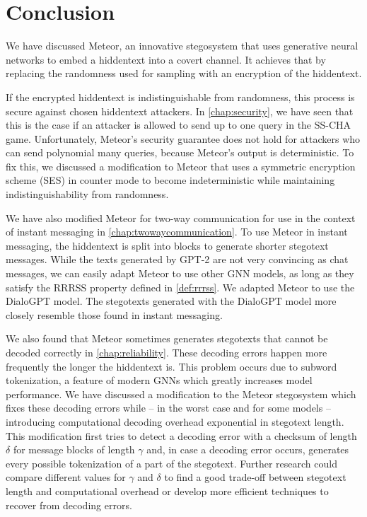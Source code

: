 \chapter{Conclusion}
\label{chap:conclusion}

We have discussed Meteor, an innovative stegosystem that uses generative neural networks to embed a hiddentext into a covert channel.
It achieves that by replacing the randomness used for sampling with an encryption of the hiddentext.

If the encrypted hiddentext is indistinguishable from randomness, this process is secure against chosen hiddentext attackers.
In \autoref{chap:security}, we have seen that this is the case if an attacker is allowed to send up to one query in the SS-CHA game.
Unfortunately, Meteor's security guarantee does not hold for attackers who can send polynomial many queries, because Meteor's output is deterministic.
To fix this, we discussed a modification to Meteor that uses a symmetric encryption scheme (SES) in counter mode to become indeterministic while maintaining indistinguishability from randomness.

We have also modified Meteor for two-way communication for use in the context of instant messaging in \autoref{chap:twowaycommunication}.
To use Meteor in instant messaging, the hiddentext is split into blocks to generate shorter stegotext messages.
While the texts generated by GPT-2 are not very convincing as chat messages, we can easily adapt Meteor to use other GNN models, as long as they satisfy the RRRSS property defined in \autoref{def:rrrss}.
We adapted Meteor to use the DialoGPT model.
The stegotexts generated with the DialoGPT model more closely resemble those found in instant messaging.

We also found that Meteor sometimes generates stegotexts that cannot be decoded correctly in \autoref{chap:reliability}.
These decoding errors happen more frequently the longer the hiddentext is.
This problem occurs due to subword tokenization, a feature of modern GNNs which greatly increases model performance.
We have discussed a modification to the Meteor stegosystem which fixes these decoding errors while -- in the worst case and for some models -- introducing computational decoding overhead exponential in stegotext length.
This modification first tries to detect a decoding error with a checksum of length $\delta$ for message blocks of length $\gamma$ and, in case a decoding error occurs, generates every possible tokenization of a part of the stegotext.
Further research could compare different values for $\gamma$ and $\delta$ to find a good trade-off between stegotext length and computational overhead or develop more efficient techniques to recover from decoding errors.

